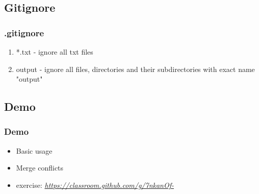 	\subsection{Gitignore}
    \begin{frame}
		\frametitle{.gitignore}
        \begin{enumerate}
        	\item *.txt - ignore all txt files
        	\item output - ignore all files, directories and their subdirectories with exact name "output"
        \end{enumerate}
	\end{frame}
    
    \subsection{Demo}
    \begin{frame} 
		\frametitle{Demo}
        \begin{itemize}
        	\item Basic usage
            \item Merge conflicts
            \item exercise: 
            \href{https://classroom.github.com/g/7nkanOf-}{\textit{https://classroom.github.com/g/7nkanOf-}}
        \end{itemize}
	\end{frame}

